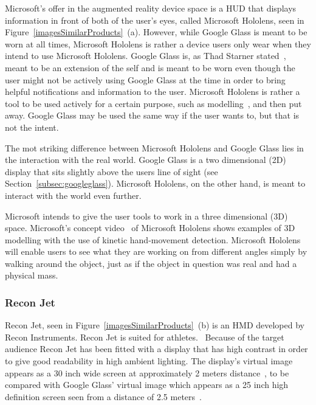 Microsoft's offer in the augmented reality device space is a HUD that displays information in front of both of the user's eyes, called Microsoft Hololens, seen in Figure~\ref{imagesSimilarProducts}~(a). 
However, while Google Glass is meant to be worn at all times, Microsoft Hololens is rather a device users only wear when they intend to use Microsoft Hololens. Google Glass is, as Thad Starner stated~\cite{6504855}, meant to be an extension of the self and is meant to be worn even though the user might not be actively using Google Glass at the time in order to bring helpful notifications and information to the user. Microsoft Hololens is rather a tool to be used actively for a certain purpose, such as modelling~\cite{hololensDemo}, and then put away. Google Glass may be used the same way if the user wants to, but that is not the intent.

The mot striking difference between Microsoft Hololens and Google Glass lies in the interaction with the real world. Google Glass is a two dimensional (2D) display that sits slightly above the users line of sight (see Section~\ref{subsec:googleglass}). Microsoft Hololens, on the other hand, is meant to interact with the world even further.

Microsoft intends to give the user tools to work in a three dimensional (3D) space. Microsoft's concept video~\cite{hololensConceptVideo} of Microsoft Hololens shows examples of 3D modelling with the use of kinetic hand-movement detection. Microsoft Hololens will enable users to see what they are working on from different angles simply by walking around the object, just as if the object in question was real and had a physical mass.

\subsubsection{Recon Jet~\cite{reconJet}}

Recon Jet, seen in Figure~\ref{imagesSimilarProducts}~(b) is an HMD developed by Recon Instruments. Recon Jet is suited for athletes.~\cite{reconJet} Because of the target audience Recon Jet has been fitted with a display that has high contrast in order to give good readability in high ambient lighting. The display's virtual image appears as  a 30 inch wide screen at approximately 2 meters distance~\cite{reconJetSpecs}, to be compared with Google Glass' virtual image which appears as a 25 inch high definition screen seen from a distance of 2.5 meters~\cite{GlassSpecs}.

